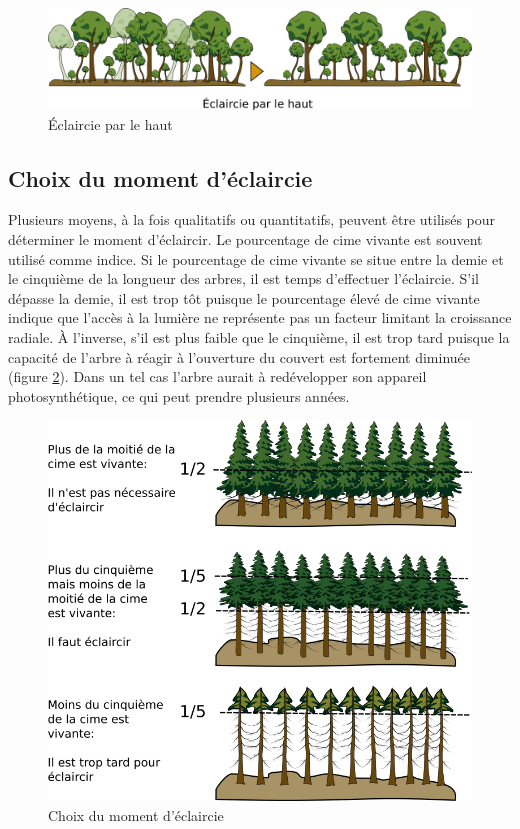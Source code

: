 \begin{figure}[!h]
	\centering
	\includegraphics[width=1\linewidth]{./img/ch8_haut}
	\caption{Éclaircie par le haut}
	\label{fig:haut}
\end{figure}


\subsection{Choix du moment d'éclaircie}

Plusieurs moyens, à la fois qualitatifs ou quantitatifs, peuvent être utilisés pour déterminer le moment d'éclaircir. Le pourcentage de cime vivante est souvent utilisé comme indice. Si le pourcentage de cime vivante se situe entre la demie et le cinquième de la longueur des arbres, il est temps d'effectuer l'éclaircie. S'il dépasse la demie, il est trop tôt puisque le pourcentage élevé de cime vivante indique que l'accès à la lumière ne représente pas un facteur limitant la croissance radiale. À l'inverse, s'il est plus faible que le cinquième, il est trop tard puisque la capacité de l'arbre à réagir à l'ouverture du couvert est fortement diminuée (figure \ref{fig:cime}). Dans un tel cas l'arbre aurait à redévelopper son appareil photosynthétique, ce qui peut prendre plusieurs années.\\

\begin{figure}[!h]
	\centering
	\includegraphics[width=0.8\linewidth]{./img/ch8_cime}
	\caption{Choix du moment d'éclaircie}
	\label{fig:cime}
\end{figure}

